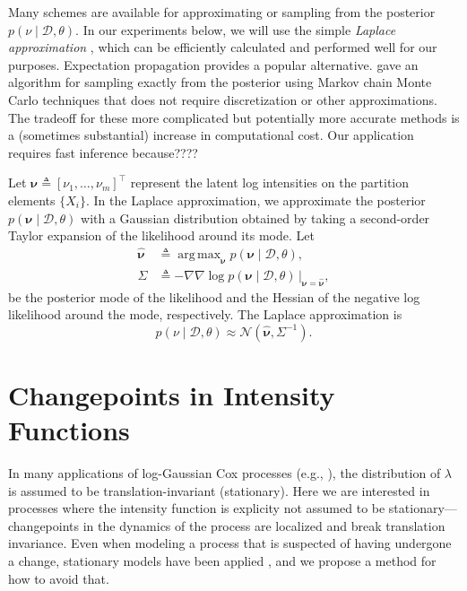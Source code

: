\documentclass{article}
\newcommand{\deq}{\triangleq}
\newcommand{\cm}[1]{\mathcal{#1}}
\newcommand{\data}{\cm{D}}
\newcommand{\given}{\mid}
\DeclareMathOperator*{\argmax}{arg\,max}
\begin{document}
Many schemes are available for approximating or sampling from the
posterior $p(\nu \given \data, \theta)$.  In our experiments below, we
will use the simple \emph{Laplace approximation}
\citep{williamsbarber}, which can be efficiently calculated and
performed well for our purposes.  Expectation propagation
\citep{minka} provides a popular alternative.  \citet{adams} gave an
algorithm for sampling exactly from the posterior using Markov chain
Monte Carlo techniques that does not require discretization or other
approximations.  The tradeoff for these more complicated but
potentially more accurate methods is a (sometimes substantial)
increase in computational cost. Our application requires fast inference because????

Let $\bm{\nu} \deq [\nu_1, \dotsc, \nu_m]^\top$ represent the latent
log intensities on the partition elements $\lbrace X_i \rbrace$.  In
the Laplace approximation, we approximate the posterior $p(\bm{\nu}
\given \data, \theta)$ with a Gaussian distribution obtained by taking
a second-order Taylor expansion of the likelihood around its mode.
Let
\begin{align*}
  \hat{\bm{\nu}}
  &\deq 
  \argmax_{\bm{\nu}} p(\bm{\nu} \given \data, \theta), \\
  \Sigma 
  &\deq 
  -\nabla\nabla \log p(\bm{\nu} \given \data, \theta)
  \,
  \Bigr\rvert_{\bm{\nu} = \hat{\bm{\nu}}},
\end{align*}
be the posterior mode of the likelihood and the Hessian of the
negative log likelihood around the mode, respectively.  The Laplace
approximation is 
\begin{equation*}
  p(\nu \given \data, \theta) 
  \approx
  \cm{N}(\hat{\bm{\nu}}, \Sigma^{-1}).
\end{equation*}

\section{Changepoints in Intensity Functions}

In many applications of log-Gaussian Cox processes (e.g.,
\citep{moller, adams}), the distribution of $\lambda$ is assumed to be
translation-invariant (stationary).  Here we are interested in
processes where the intensity function is explicity not assumed to be
stationary---changepoints in the dynamics of the process are localized
and break translation invariance.  Even when modeling a process that
is suspected of having undergone a change, stationary models have been
applied \citep{adams}, and we propose a method for how to avoid that.
\end{document}
